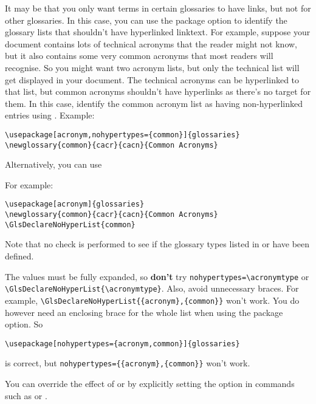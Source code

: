 \documentclass[report,inlinetitle]{nlctdoc}
\newcommand*{\gloskey}[2][newglossaryentry]{\csopt{#1}{#2}}
\begin{document}
It may be that you only want terms in certain glossaries to have
links, but not for other glossaries. In this case, you can use the
package option  to identify the glossary lists
that shouldn't have hyperlinked \gls{linktext}. For example, suppose
your document contains lots of technical acronyms that the reader
might not know, but it also contains some very common acronyms that
most readers will recognise. So you might want two acronym lists,
but only the technical list will get displayed in your document. The
technical acronyms can be hyperlinked to that list, but common
acronyms shouldn't have hyperlinks as there's no target for them. In
this case, identify the common acronym list as having
non-hyperlinked entries using . Example:
\begin{verbatim}
\usepackage[acronym,nohypertypes={common}]{glossaries}
\newglossary{common}{cacr}{cacn}{Common Acronyms}
\end{verbatim}
Alternatively, you can use
\begin{definition}[\DescribeMacro{\GlsDeclareNoHyperList}]
\end{definition}
For example:
\begin{verbatim}
\usepackage[acronym]{glossaries}
\newglossary{common}{cacr}{cacn}{Common Acronyms}
\GlsDeclareNoHyperList{common}
\end{verbatim}
Note that no check is performed to see if the glossary types listed
in  or  have been
defined.

\begin{important}
The values must be fully expanded, so \textbf{don't} try
\verb|nohypertypes=\acronymtype| or
\verb|\GlsDeclareNoHyperList{\acronymtype}|.
Also, avoid unnecessary braces. For example,
\verb|\GlsDeclareNoHyperList{{acronym},{common}}| won't work. You do
however need an enclosing brace for the whole list when using the
package option. So
\begin{verbatim}
\usepackage[nohypertypes={acronym,common}]{glossaries}
\end{verbatim}
is correct, but \verb|nohypertypes={{acronym},{common}}| won't work.
\end{important}

You can override the effect of  or
 by explicitly setting the
\gloskey[glslink]{hyper} option in commands such as  or
.
\end{document}

